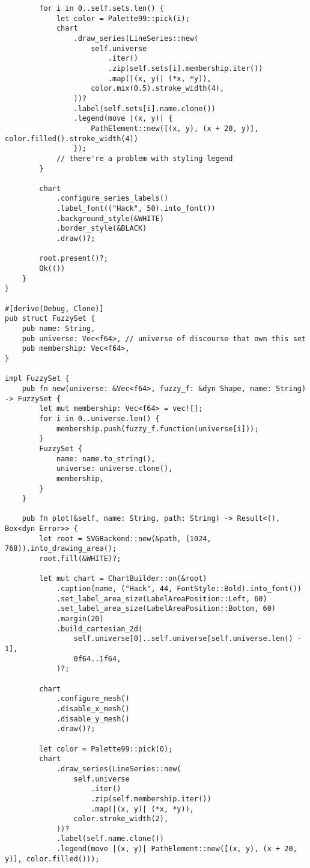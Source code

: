 \begin{verbatim}
        for i in 0..self.sets.len() {
            let color = Palette99::pick(i);
            chart
                .draw_series(LineSeries::new(
                    self.universe
                        .iter()
                        .zip(self.sets[i].membership.iter())
                        .map(|(x, y)| (*x, *y)),
                    color.mix(0.5).stroke_width(4),
                ))?
                .label(self.sets[i].name.clone())
                .legend(move |(x, y)| {
                    PathElement::new([(x, y), (x + 20, y)], color.filled().stroke_width(4))
                });
            // there're a problem with styling legend
        }

        chart
            .configure_series_labels()
            .label_font(("Hack", 50).into_font())
            .background_style(&WHITE)
            .border_style(&BLACK)
            .draw()?;

        root.present()?;
        Ok(())
    }
}

#[derive(Debug, Clone)]
pub struct FuzzySet {
    pub name: String,
    pub universe: Vec<f64>, // universe of discourse that own this set
    pub membership: Vec<f64>,
}

impl FuzzySet {
    pub fn new(universe: &Vec<f64>, fuzzy_f: &dyn Shape, name: String) -> FuzzySet {
        let mut membership: Vec<f64> = vec![];
        for i in 0..universe.len() {
            membership.push(fuzzy_f.function(universe[i]));
        }
        FuzzySet {
            name: name.to_string(),
            universe: universe.clone(),
            membership,
        }
    }

    pub fn plot(&self, name: String, path: String) -> Result<(), Box<dyn Error>> {
        let root = SVGBackend::new(&path, (1024, 768)).into_drawing_area();
        root.fill(&WHITE)?;

        let mut chart = ChartBuilder::on(&root)
            .caption(name, ("Hack", 44, FontStyle::Bold).into_font())
            .set_label_area_size(LabelAreaPosition::Left, 60)
            .set_label_area_size(LabelAreaPosition::Bottom, 60)
            .margin(20)
            .build_cartesian_2d(
                self.universe[0]..self.universe[self.universe.len() - 1],
                0f64..1f64,
            )?;

        chart
            .configure_mesh()
            .disable_x_mesh()
            .disable_y_mesh()
            .draw()?;

        let color = Palette99::pick(0);
        chart
            .draw_series(LineSeries::new(
                self.universe
                    .iter()
                    .zip(self.membership.iter())
                    .map(|(x, y)| (*x, *y)),
                color.stroke_width(2),
            ))?
            .label(self.name.clone())
            .legend(move |(x, y)| PathElement::new([(x, y), (x + 20, y)], color.filled()));


\end{verbatim}
